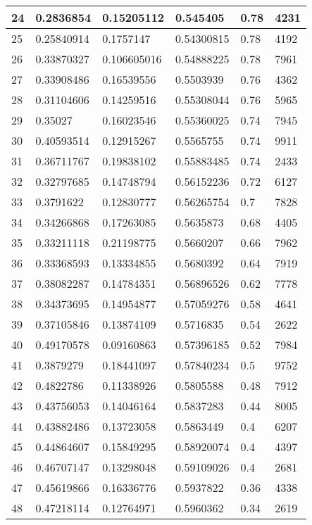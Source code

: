 \begin{longtable}{|l|l|l|l|l|l|}
24 & 0.2836854 & 0.15205112 & 0.545405 & 0.78 & 4231 \\ \hline 
25 & 0.25840914 & 0.1757147 & 0.54300815 & 0.78 & 4192 \\ \hline 
26 & 0.33870327 & 0.106605016 & 0.54888225 & 0.78 & 7961 \\ \hline 
27 & 0.33908486 & 0.16539556 & 0.5503939 & 0.76 & 4362 \\ \hline 
28 & 0.31104606 & 0.14259516 & 0.55308044 & 0.76 & 5965 \\ \hline 
29 & 0.35027 & 0.16023546 & 0.55360025 & 0.74 & 7945 \\ \hline 
30 & 0.40593514 & 0.12915267 & 0.5565755 & 0.74 & 9911 \\ \hline 
31 & 0.36711767 & 0.19838102 & 0.55883485 & 0.74 & 2433 \\ \hline 
32 & 0.32797685 & 0.14748794 & 0.56152236 & 0.72 & 6127 \\ \hline 
33 & 0.3791622 & 0.12830777 & 0.56265754 & 0.7 & 7828 \\ \hline 
34 & 0.34266868 & 0.17263085 & 0.5635873 & 0.68 & 4405 \\ \hline 
35 & 0.33211118 & 0.21198775 & 0.5660207 & 0.66 & 7962 \\ \hline 
36 & 0.33368593 & 0.13334855 & 0.5680392 & 0.64 & 7919 \\ \hline 
37 & 0.38082287 & 0.14784351 & 0.56896526 & 0.62 & 7778 \\ \hline 
38 & 0.34373695 & 0.14954877 & 0.57059276 & 0.58 & 4641 \\ \hline 
39 & 0.37105846 & 0.13874109 & 0.5716835 & 0.54 & 2622 \\ \hline 
40 & 0.49170578 & 0.09160863 & 0.57396185 & 0.52 & 7984 \\ \hline 
41 & 0.3879279 & 0.18441097 & 0.57840234 & 0.5 & 9752 \\ \hline 
42 & 0.4822786 & 0.11338926 & 0.5805588 & 0.48 & 7912 \\ \hline 
43 & 0.43756053 & 0.14046164 & 0.5837283 & 0.44 & 8005 \\ \hline 
44 & 0.43882486 & 0.13723058 & 0.5863449 & 0.4 & 6207 \\ \hline 
45 & 0.44864607 & 0.15849295 & 0.58920074 & 0.4 & 4397 \\ \hline 
46 & 0.46707147 & 0.13298048 & 0.59109026 & 0.4 & 2681 \\ \hline 
47 & 0.45619866 & 0.16336776 & 0.5937822 & 0.36 & 4338 \\ \hline 
48 & 0.47218114 & 0.12764971 & 0.5960362 & 0.34 & 2619 \\ \hline 

\end{longtable}
